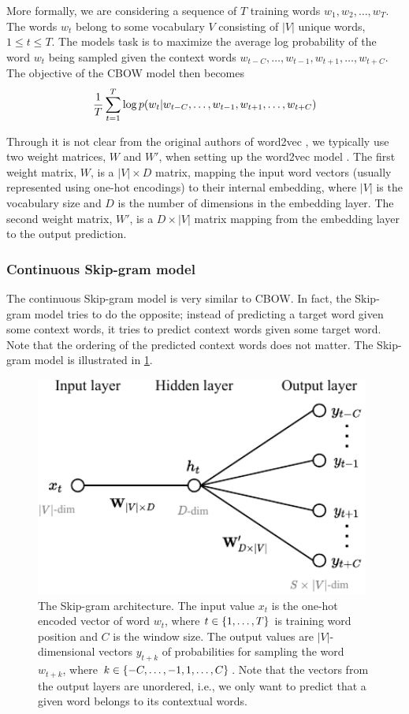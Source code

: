 More formally, we are considering a sequence of $T$ training words $w_1, w_2, \ldots, w_T$. The words $w_t$ belong to some vocabulary $V$ consisting of $|V|$ unique words, $1 \leq t \leq T$. The models task is to maximize the average log probability of the word $w_t$ being sampled given the context words $w_{t-C}, \ldots, w_{t-1}, w_{t+1}, \ldots, w_{t+C}$. The objective of the CBOW model then becomes
\begin{align}
    \frac{1}{T} \sum\limits_{t=1}^{T} \log p(w_t | w_{t-C}, \ldots, w_{t-1}, w_{t+1}, \ldots, w_{t+C})
    \label{eqn:cbow-objective-function}
\end{align}

Through it is not clear from the original authors of word2vec \cite{mikolov2013a, mikolov2013b}, we typically use two weight matrices, $W$ and $W'$, when setting up the word2vec model \cite{rong2016word2vec}. The first weight matrix, $W$, is a $|V| \times D$ matrix, mapping the input word vectors (usually represented using one-hot encodings) to their internal embedding, where $|V|$ is the vocabulary size and $D$ is the number of dimensions in the embedding layer. The second weight matrix, $W'$, is a $D \times |V|$ matrix mapping from the embedding layer to the output prediction.

\subsubsection{Continuous Skip-gram model}
The continuous Skip-gram model is very similar to CBOW. In fact, the Skip-gram model tries to do the opposite; instead of predicting a target word given some context words, it tries to predict context words given some target word. Note that the ordering of the predicted context words does not matter. The Skip-gram model is illustrated in \cref{fig:skip-gram-model}.

\begin{figure}[H]
    \centering
    \includegraphics[width=11cm]{thesis/figures/skim-gram_cropped.pdf}
    \caption{The Skip-gram architecture. The input value $x_t$ is the one-hot encoded vector of word $w_t$, where $t \in \left\{1, \ldots, T\right\}$ is training word position and $C$ is the window size. The output values are $|V|$-dimensional vectors $y_{t+k}$ of probabilities for sampling the word $w_{t+k}$, where $k \in \left\{-C, \ldots, -1, 1, \ldots, C\right\}$. Note that the vectors from the output layers are unordered, i.e., we only want to predict that a given word belongs to its contextual words.}
    \label{fig:skip-gram-model}
\end{figure}

